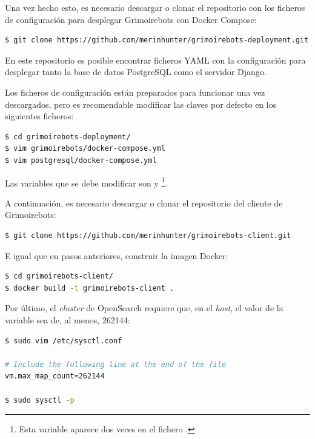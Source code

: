 Una vez hecho esto, es necesario descargar o clonar el repositorio con los ficheros de configuración para desplegar Grimoirebots con Docker Compose:

\begin{lstlisting}[language=bash]
$ git clone https://github.com/merinhunter/grimoirebots-deployment.git
\end{lstlisting}

En este repositorio es posible encontrar ficheros YAML con la configuración para desplegar tanto la base de datos PostgreSQL como el servidor Django.

Los ficheros de configuración están preparados para funcionar una vez descargados, pero es recomendable modificar las claves por defecto en los siguientes ficheros:

\begin{lstlisting}[language=bash]
$ cd grimoirebots-deployment/
$ vim grimoirebots/docker-compose.yml
$ vim postgresql/docker-compose.yml
\end{lstlisting}

Las variables que se debe modificar son  y \footnote{Esta variable aparece dos veces en el fichero .}.

A continuación, es necesario descargar o clonar el repositorio del cliente de Grimoirebots:

\begin{lstlisting}[language=bash]
$ git clone https://github.com/merinhunter/grimoirebots-client.git
\end{lstlisting}

E igual que en pasos anteriores, construir la imagen Docker:

\begin{lstlisting}[language=bash]
$ cd grimoirebots-client/
$ docker build -t grimoirebots-client .
\end{lstlisting}

Por último, el \emph{cluster} de OpenSearch requiere que, en el \emph{host}, el valor de la variable  sea de, al menos, 262144:

\begin{lstlisting}[language=bash]
$ sudo vim /etc/sysctl.conf

# Include the following line at the end of the file
vm.max_map_count=262144

$ sudo sysctl -p
\end{lstlisting}

